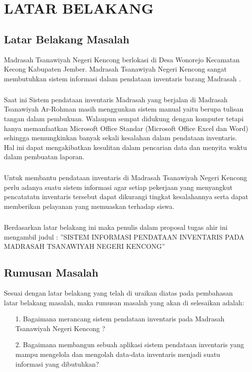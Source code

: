 \documentclass{jtetiproposalskripsi}
\begin{document}
\tableofcontents
\listoftables
\listoffigures
{}
\clearpage{}\setcounter{page}{1}




\chapter{LATAR BELAKANG}

\section{Latar Belakang Masalah}
Madrasah Tsanawiyah Negeri Kencong berlokasi di Desa Wonorejo Kecamatan Kecong Kabupaten Jember. Madrasah Tsanawiyah Negeri Kencong sangat membutuhkan sistem informasi dalam pendataan inventaris barang Madrasah . 
\paragraph{}
Saat ini Sistem pendataan inventaris Madrasah yang berjalan di Madrasah Tsanawiyah Ar-Rohman masih menggunkan sistem manual yaitu berupa tulisan tangan dalam pembukuan. Walaupun sempat didukung dengan komputer tetapi hanya memanfaatkan  Microsoft Office Standar (Microsoft Office Excel dan Word)  sehingga memungkinkan banyak sekali kesalahan dalam pendataan inventaris. Hal ini dapat mengakibatkan kesulitan dalam pencarian data dan menyita waktu dalam pembuatan laporan. 
\paragraph{}
Untuk membantu pendataan inventaris di Madrasah Tsanawiyah Negeri Kencong perlu adanya suatu sistem informasi agar setiap pekerjaan yang menyangkut pencatatatn inventaris tersebut dapat dikurangi tingkat kesalahannya serta dapat memberikan pelayanan yang memuaskan terhadap siswa.
\paragraph{}
Berdasarkan latar belakang ini maka penulis dalam proposal tugas ahir ini mengambil judul : 
”SISTEM INFORMASI PENDATAAN INVENTARIS PADA MADRASAH TSANAWIYAH NEGERI KENCONG”


\section{Rumusan Masalah}
Sesuai dengan latar belakang yang telah di uraikan diatas pada pembahasan latar belakang masalah, maka rumusan masalah yang akan di selesaikan adalah:
\begin{itemize}
\item[1.]Bagaimana merancang sistem pendataan inventaris pada Madrasah Tsanawiyah Negeri Kencong ?
\item[2.]Bagaimana membangun sebuah aplikasi sistem pendataan inventaris yang mampu mengelola dan mengolah data-data inventaris menjadi  suatu informasi yang dibutuhkan?
\end{itemize}
\end{document}
